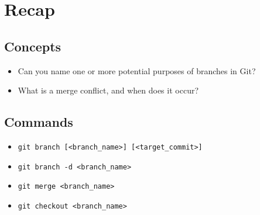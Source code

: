 \documentclass[../main/git_course_main.tex]{subfiles}
\begin{document}

\newpage
\section{Recap}

\subsection{Concepts}

\begin{itemize}
	\item Can you name one or more potential purposes of branches in Git?
	\item What is a merge conflict, and when does it occur?
\end{itemize}

\subsection{Commands}

\begin{itemize}
	\item \verb$git branch [<branch_name>] [<target_commit>]$
	\item \verb$git branch -d <branch_name>$
	\item \verb$git merge <branch_name>$
	\item \verb$git checkout <branch_name>$
\end{itemize}
\end{document}

